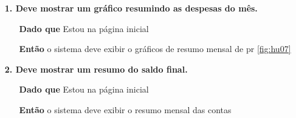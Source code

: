 \begin{itemize}

      \item[] \textbf{1. Deve mostrar um gráfico resumindo as despesas do mês.}

    \begin{itemize}
        \item[\textbf{Dado que}] Estou na página inicial
        \item[\textbf{Então}] o sistema deve exibir o gráficos de resumo mensal de pr \ref{fig:hu07} 
    \end{itemize}

    \item[] \textbf{2. Deve mostrar um resumo do saldo final.}

    \begin{itemize}
        \item[\textbf{Dado que}]  Estou na página inicial
        \item[\textbf{Então}] o sistema deve exibir o resumo mensal das contas 
    \end{itemize}
    
\end{itemize}